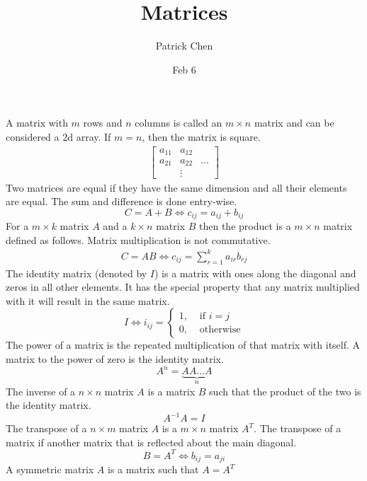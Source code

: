 \documentclass{article}
\title{Matrices}
\author{Patrick Chen}
\date{Feb 6}
\theoremstyle{mytheoremstyle}
\theoremstyle{mytheoremstyle}
\theoremstyle{myproblemstyle}
\begin{document}
    \maketitle
    A matrix with $m$ rows and $n$ columns is called an $m\times n$ matrix and
    can be considered a 2d array. If $m=n$, then the matrix is square.
    \begin{align*}
        \begin{bmatrix}
            a_{11} & a_{12} & \\
            a_{21} & a_{22} &\dots \\
                   & \vdots &
        \end{bmatrix}
    \end{align*}
    Two matrices are equal if they have the same dimension and all their
    elements are equal. The sum and difference is done entry-wise.
    \[
        C = A + B \Leftrightarrow c_{ij} = a_{ij} + b_{ij}
    \]
    For a $m\times k$ matrix $A$ and a $k \times n$ matrix $B$ then the product
    is a $m\times n$ matrix defined as follows. Matrix multiplication is not
    commutative.
    \begin{align*}
        C = AB \Leftrightarrow c_{ij} = \sum_{r=1}^k a_{ir}b_{rj}
    \end{align*}
    The identity matrix (denoted by $I$) is a matrix with ones along the diagonal and zeros in
    all other elements. It has the special property that any matrix multiplied
    with it will result in the same matrix.
    \[
        I \Leftrightarrow i_{ij} = \begin{cases}
            1, &\text{ if } i = j\\
            0, &\text{ otherwise}
        \end{cases}
    \]
    The power of a matrix is the repeated multiplication of that matrix with
    itself. A matrix to the power of zero is the identity matrix.
    \[
        A^n = \underbrace{A A \dots A}_{n}
    \]
    The inverse of a $n\times n$ matrix $A$ is a matrix $B$ such that the
    product of the two is the identity matrix.
    \[
        A^{-1} A = I
    \]
    The transpose of a $n\times m$ matrix $A$ is a $m\times n$ matrix $A^T$. The
    transpose of a matrix if another matrix that is reflected about the main
    diagonal.
    \[
        B = A^T \Leftrightarrow b_{ij} = a_{ji}
    \]
    A symmetric matrix $A$ is a matrix such that $A=A^T$
\end{document}
